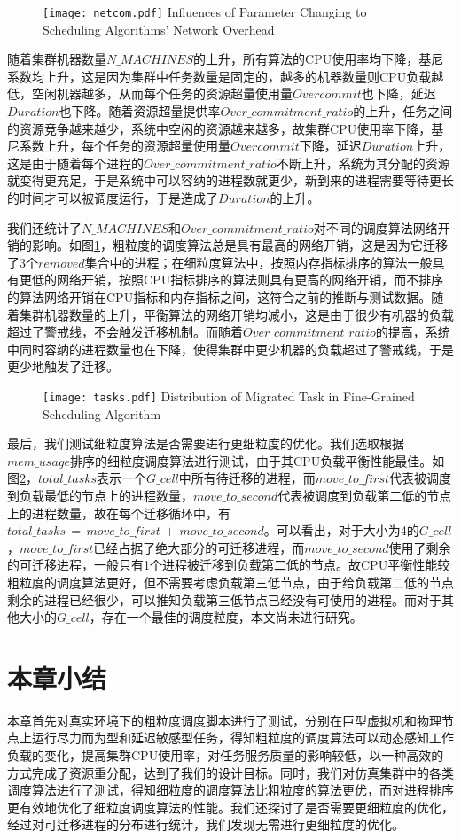 \begin{figure}[!htp]
  \centering
  \texttt{[image: netcom.pdf]}
    {Influences of Parameter Changing to Scheduling Algorithms' Network Overhead}
  \label{fig:netcom}
\end{figure}

随着集群机器数量$N\_MACHINES$的上升，所有算法的CPU使用率均下降，基尼系数均上升，这是因为集群中任务数量是固定的，越多的机器数量则CPU负载越低，空闲机器越多，从而每个任务的资源超量使用量$Overcommit$也下降，延迟$Duration$也下降。随着资源超量提供率$Over\_commitment\_ratio$的上升，任务之间的资源竞争越来越少，系统中空闲的资源越来越多，故集群CPU使用率下降，基尼系数上升，每个任务的资源超量使用量$Overcommit$下降，延迟$Duration$上升，这是由于随着每个进程的$Over\_commitment\_ratio$不断上升，系统为其分配的资源就变得更充足，于是系统中可以容纳的进程数就更少，新到来的进程需要等待更长的时间才可以被调度运行，于是造成了$Duration$的上升。

我们还统计了$N\_MACHINES$和$Over\_commitment\_ratio$对不同的调度算法网络开销的影响。如图\ref{fig:netcom}，粗粒度的调度算法总是具有最高的网络开销，这是因为它迁移了3个$removed$集合中的进程；在细粒度算法中，按照内存指标排序的算法一般具有更低的网络开销，按照CPU指标排序的算法则具有更高的网络开销，而不排序的算法网络开销在CPU指标和内存指标之间，这符合之前的推断与测试数据。随着集群机器数量的上升，平衡算法的网络开销均减小，这是由于很少有机器的负载超过了警戒线，不会触发迁移机制。而随着$Over\_commitment\_ratio$的提高，系统中同时容纳的进程数量也在下降，使得集群中更少机器的负载超过了警戒线，于是更少地触发了迁移。

\begin{figure}[!htp]
  \centering
  \texttt{[image: tasks.pdf]}
    {Distribution of Migrated Task in Fine-Grained Scheduling Algorithm}
  \label{fig:distr}
\end{figure}



最后，我们测试细粒度算法是否需要进行更细粒度的优化。我们选取根据$mem\_usage$排序的细粒度调度算法进行测试，由于其CPU负载平衡性能最佳。如图\ref{fig:distr}，$total\_tasks$表示一个$G\_cell$中所有待迁移的进程，而$move\_to\_first$代表被调度到负载最低的节点上的进程数量，$move\_to\_second$代表被调度到负载第二低的节点上的进程数量，故在每个迁移循环中，有$total\_tasks\,=\,move\_to\_first\,+\,move\_to\_second$。可以看出，对于大小为4的$G\_cell$，$move\_to\_first$已经占据了绝大部分的可迁移进程，而$move\_to\_second$使用了剩余的可迁移进程，一般只有1个进程被迁移到负载第二低的节点。故CPU平衡性能较粗粒度的调度算法更好，但不需要考虑负载第三低节点，由于给负载第二低的节点剩余的进程已经很少，可以推知负载第三低节点已经没有可使用的进程。而对于其他大小的$G\_cell$，存在一个最佳的调度粒度，本文尚未进行研究。

\section{本章小结}
本章首先对真实环境下的粗粒度调度脚本进行了测试，分别在巨型虚拟机和物理节点上运行尽力而为型和延迟敏感型任务，得知粗粒度的调度算法可以动态感知工作负载的变化，提高集群CPU使用率，对任务服务质量的影响较低，以一种高效的方式完成了资源重分配，达到了我们的设计目标。同时，我们对仿真集群中的各类调度算法进行了测试，得知细粒度的调度算法比粗粒度的算法更优，而对进程排序更有效地优化了细粒度调度算法的性能。我们还探讨了是否需要更细粒度的优化，经过对可迁移进程的分布进行统计，我们发现无需进行更细粒度的优化。
